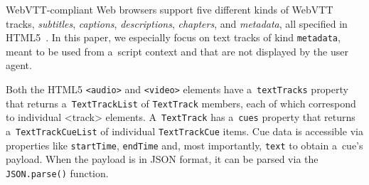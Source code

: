 \documentclass{sig-alternate}
\begin{document}
\begin{comment}
\begin{table}[b!]\footnotesize
\begin{tabular}{ r p{5.5cm} } %
\textbf{WebVTT Kind} & \textbf{Description and Default Behavior}\\

\texttt{subtitles} & Transcription or translation of speech,
suitable for when sound is available but not understood.
Overlaid on the video.\\

\texttt{captions} & Transcription or translation of the dialogue,
sound effects, and other relevant audio information,
suitable for when sound is unavailable or not clearly audible.
Overlaid on the video;
labeled as appropriate for the hard-of-hearing.\\

\texttt{descriptions} & Textual descriptions of the video component
of the media resource, intended for audio synthesis
when the visual component is obscured, unavailable, or unusable.
Synthesized as audio.\\

\texttt{chapters} & Chapter titles, intended to be used for navigating
the media resource. Displayed as an interactive (potentially nested)
list in the user agent's interface.\\

\texttt{metadata} & Metadata intended for use from script context.
Not displayed by user agent.\\
\end{tabular}
  \caption{WebVTT text track kinds in HTML5~\cite{berjon2013html5}}
  \label{table:texttrackkinds}
\end{table}
\end{comment}

WebVTT-compliant Web browsers %
support five different kinds of
WebVTT tracks, \emph{subtitles}, \emph{captions},
\emph{descriptions}, \emph{chapters}, and \emph{metadata},
all specified in HTML5~\cite{berjon2013html5}.
In this paper, we especially focus on
text tracks of kind \texttt{metadata},
meant to be used from a~script context and
that are not displayed by the user agent.

Both the HTML5 \texttt{<audio>} and \texttt{<video>} elements
have a~\texttt{textTracks} property
that returns a~\texttt{TextTrackList} of
\texttt{TextTrack} members, each of which correspond
to individual <track> elements.
A~\texttt{TextTrack} has a~\texttt{cues} property
that returns a~\texttt{TextTrackCueList} of individual
\texttt{TextTrackCue} items.
Cue data is accessible via properties like
\texttt{startTime}, \texttt{endTime} and,
most importantly, \texttt{text} to obtain a~cue's payload.
When the payload is in JSON format,
it can be parsed via the
\texttt{JSON.parse()} function.
\end{document}
